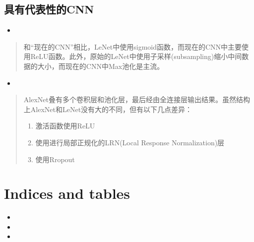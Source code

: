 \documentclass[letterpaper,10pt,english]{sphinxmanual}
\begin{document}
\section{具有代表性的CNN}
\label{\detokenize{_u5377_u79ef_u795e_u7ecf_u7f51_u7edc:id6}}\begin{itemize}
\item {} 

\end{itemize}
\begin{quote}


和“现在的CNN”相比，LeNet中使用sigmoid函数，而现在的CNN中主要使用ReLU函数。此外，原始的LeNet中使用子采样(subsampling)缩小中间数据的大小，而现在的CNN中Max池化是主流。
\end{quote}
\begin{itemize}
\item {} 

\end{itemize}
\begin{quote}


AlexNet叠有多个卷积层和池化层，最后经由全连接层输出结果。虽然结构上AlexNet和LeNet没有大的不同，但有以下几点差异：
\begin{enumerate}
\item {} 
激活函数使用ReLU

\item {} 
使用进行局部正规化的LRN(Local Response Normalization)层

\item {} 
使用Rropout

\end{enumerate}
\end{quote}


\chapter{Indices and tables}
\label{\detokenize{index:indices-and-tables}}\begin{itemize}
\item {} 

\item {} 

\item {} 

\end{itemize}



\renewcommand{\indexname}{索引}
\printindex
\end{document}
